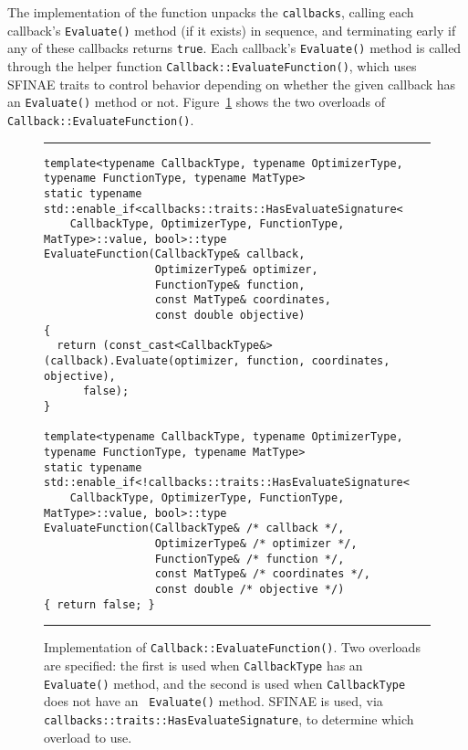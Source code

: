The implementation of the function unpacks the {\tt callbacks},
calling each callback's {\tt Evaluate()} method (if it exists) in sequence,
and terminating early if any of these callbacks returns {\tt true}.
Each callback's {\tt Evaluate()} method is called through the helper
function {\tt Callback::EvaluateFunction()},
which uses SFINAE traits to control behavior depending on whether
the given callback has an {\tt Evaluate()} method or not.
Figure~\ref{fig:callback_evaluate_function} shows the two overloads of
{\tt Callback::EvaluateFunction()}.

\begin{figure}[t!]
\hrule
\vspace{1ex}
\begin{verbatim}
template<typename CallbackType, typename OptimizerType, typename FunctionType, typename MatType>
static typename std::enable_if<callbacks::traits::HasEvaluateSignature<
    CallbackType, OptimizerType, FunctionType, MatType>::value, bool>::type
EvaluateFunction(CallbackType& callback,
                 OptimizerType& optimizer,
                 FunctionType& function,
                 const MatType& coordinates,
                 const double objective)
{
  return (const_cast<CallbackType&>(callback).Evaluate(optimizer, function, coordinates, objective),
      false);
}

template<typename CallbackType, typename OptimizerType, typename FunctionType, typename MatType>
static typename std::enable_if<!callbacks::traits::HasEvaluateSignature<
    CallbackType, OptimizerType, FunctionType, MatType>::value, bool>::type
EvaluateFunction(CallbackType& /* callback */,
                 OptimizerType& /* optimizer */,
                 FunctionType& /* function */,
                 const MatType& /* coordinates */,
                 const double /* objective */)
{ return false; }
\end{verbatim}
\hrule
\vspace*{-0.5em}
\label{fig:callback_evaluate_function}
\caption{Implementation of {\tt Callback::EvaluateFunction()}.  Two overloads
are specified: the first is used when {\tt CallbackType} has an {\tt Evaluate()}
method, and the second is used when {\tt CallbackType} does not have an {\tt
Evaluate()} method.  SFINAE is used, via {\tt
callbacks::traits::HasEvaluateSignature}, to determine which overload to use.}
\end{figure}


